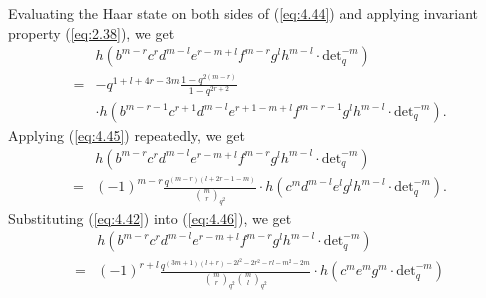 \documentclass[table,a4paper,reqno]{amsart}
\numberwithin{equation}{section}
\theoremstyle{definition}
\begin{document}
Evaluating the Haar state on both sides of (\ref{eq:4.44}) and applying invariant property (\ref{eq:2.38}), we get
\begin{equation}\label{eq:4.45}
    \begin{split}
        &h\left(b^{m-r}c^{r}d^{m-l}e^{r-m+l}f^{m-r}g^{l}h^{m-l}\cdot\text{det}_q^{-m}\right)\\
        =&-q^{1+l+4r-3m}\frac{1-q^{2(m-r)}}{1-q^{2r+2}}\\
        &\cdot h\left(b^{m-r-1}c^{r+1}d^{m-l}e^{r+1-m+l}f^{m-r-1}g^{l}h^{m-l}\cdot\text{det}_q^{-m}\right).
    \end{split}
\end{equation}
Applying (\ref{eq:4.45}) repeatedly, we get
\begin{equation}\label{eq:4.46}
    \begin{split}
        &h\left(b^{m-r}c^{r}d^{m-l}e^{r-m+l}f^{m-r}g^{l}h^{m-l}\cdot\text{det}_q^{-m}\right)\\
        =&(-1)^{m-r}\frac{q^{(m-r)(l+2r-1-m)}}{{m\choose r}_{q^2}}\cdot h\left(c^{m}d^{m-l}e^{l}g^{l}h^{m-l}\cdot\text{det}_q^{-m}\right).
    \end{split}
\end{equation}
Substituting (\ref{eq:4.42}) into (\ref{eq:4.46}), we get
\begin{equation}\label{eq:4.47}
    \begin{split}
        &h\left(b^{m-r}c^{r}d^{m-l}e^{r-m+l}f^{m-r}g^{l}h^{m-l}\cdot\text{det}_q^{-m}\right)\\
        =&(-1)^{r+l}\frac{q^{(3m+1)(l+r)-2l^2-2r^2-rl-m^2-2m}}{{m\choose r}_{q^2}{m \choose l}_{q^2}}\cdot h\left(c^{m}e^{m}g^{m}\cdot\text{det}_q^{-m}\right)
    \end{split}
\end{equation}
\end{document}
